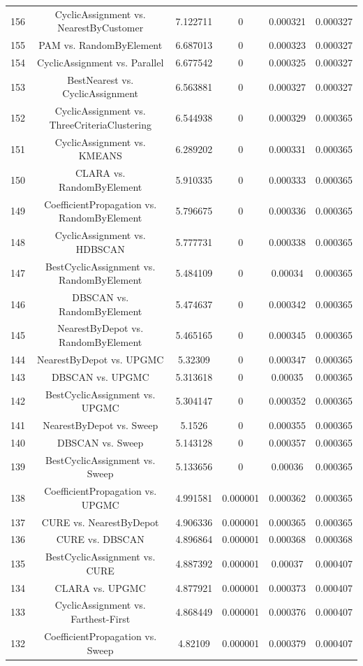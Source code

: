 \documentclass[a4paper,10pt]{article}
\begin{document}
\begin{landscape}
\begin{table}[!htp]
\begin{tabular}{cccccc}
156&CyclicAssignment vs. NearestByCustomer&7.122711&0&0.000321&0.000327\\
155&PAM vs. RandomByElement&6.687013&0&0.000323&0.000327\\
154&CyclicAssignment vs. Parallel&6.677542&0&0.000325&0.000327\\
153&BestNearest vs. CyclicAssignment&6.563881&0&0.000327&0.000327\\
152&CyclicAssignment vs. ThreeCriteriaClustering&6.544938&0&0.000329&0.000365\\
151&CyclicAssignment vs. KMEANS&6.289202&0&0.000331&0.000365\\
150&CLARA vs. RandomByElement&5.910335&0&0.000333&0.000365\\
149&CoefficientPropagation vs. RandomByElement&5.796675&0&0.000336&0.000365\\
148&CyclicAssignment vs. HDBSCAN&5.777731&0&0.000338&0.000365\\
147&BestCyclicAssignment vs. RandomByElement&5.484109&0&0.00034&0.000365\\
146&DBSCAN vs. RandomByElement&5.474637&0&0.000342&0.000365\\
145&NearestByDepot vs. RandomByElement&5.465165&0&0.000345&0.000365\\
144&NearestByDepot vs. UPGMC&5.32309&0&0.000347&0.000365\\
143&DBSCAN vs. UPGMC&5.313618&0&0.00035&0.000365\\
142&BestCyclicAssignment vs. UPGMC&5.304147&0&0.000352&0.000365\\
141&NearestByDepot vs. Sweep&5.1526&0&0.000355&0.000365\\
140&DBSCAN vs. Sweep&5.143128&0&0.000357&0.000365\\
139&BestCyclicAssignment vs. Sweep&5.133656&0&0.00036&0.000365\\
138&CoefficientPropagation vs. UPGMC&4.991581&0.000001&0.000362&0.000365\\
137&CURE vs. NearestByDepot&4.906336&0.000001&0.000365&0.000365\\
136&CURE vs. DBSCAN&4.896864&0.000001&0.000368&0.000368\\
135&BestCyclicAssignment vs. CURE&4.887392&0.000001&0.00037&0.000407\\
134&CLARA vs. UPGMC&4.877921&0.000001&0.000373&0.000407\\
133&CyclicAssignment vs. Farthest-First&4.868449&0.000001&0.000376&0.000407\\
132&CoefficientPropagation vs. Sweep&4.82109&0.000001&0.000379&0.000407\\

\end{tabular}
\end{table}
\end{landscape}
\end{document}
